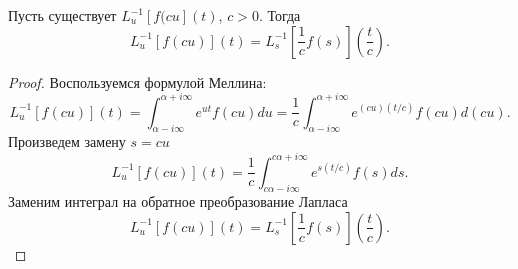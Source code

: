 \documentclass[../paper.tex]{subfiles}
\begin{document}
\begin{Lem}
\label{laplace-var-change}
Пусть существует $L^{-1}_u [f(cu](t)$, $c>0$.
Тогда
\[
    L^{-1}_u \left[ f(cu) \right](t) = L^{-1}_s \left[ \frac{1}{c}f(s) \right]\left(\frac{t}{c}\right)
.\]
\end{Lem}
\begin{proof}
Воспользуемся формулой Меллина:
\[
	L^{-1}_u\left[f\left(cu\right)\right](t) 
	= \int_{\alpha-i\infty}^{\alpha+i\infty} e^{ut}f(cu)du 
	= \frac{1}{c} \int_{\alpha-i\infty}^{\alpha+i\infty} e^{\left(cu\right) (t/c)} f(cu) d\left(cu\right)
.\]
Произведем замену $s=cu$
\[
	L^{-1}_u\left[f\left(cu\right)\right](t)
	= \frac{1}{c} \int_{c\alpha-i\infty}^{c\alpha+i\infty} e^{s (t/c)} f(s) ds
.\]
Заменим интеграл на обратное преобразование Лапласа
\[
	L^{-1}_u\left[f\left(cu\right)\right](t)
	= L^{-1}_s \left[ \frac{1}{c} f(s) \right]\left( \frac{t}{c} \right)  
.\]
\end{proof}
\end{document}
